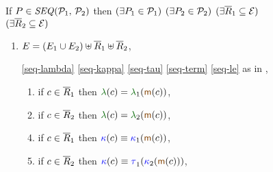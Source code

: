 \begin{figure}
  \raggedright
  
  \noindent
  If $\aPS \in \sSEMI{\aPSS_1}{\aPSS_2}$ then
  $(\exists P_1\in\mathcal{P}_1)$ $(\exists P_2\in\mathcal{P}_2)$
  $(\exists\overline{R}_1\subseteq\mathcal{E})$ $(\exists\overline{R}_2\subseteq\mathcal{E})$
  \begin{multicols}{2}
    \begin{enumerate}[topsep=0pt,label=(\textsc{s}\arabic*),ref=\textsc{s}\arabic*]
      \setcounter{enumi}{\value{BE}}
    \item \label{seq-E-phantom}
      $E=(E_1\cup E_2)\uplus\overline{R}_1 \uplus\overline{R}_2$,

    \item[\eqref{seq-lambda}]
      \eqref{seq-kappa}\;
      \eqref{seq-tau}\;
      \eqref{seq-term}\;
      \eqref{seq-le}\;
      as in ,

      \setcounter{enumi}{\value{lambda}}
    \item[] 
      \begin{enumerate}[leftmargin=0pt]
      \item \label{seq-lambda-phantom1}
        if $c\in \overline{R}_1$ then $\labeling(\cEv)=\labeling_1(\fmrg{\cEv})$,
      \item \label{seq-lambda-phantom2}
        if $c\in \overline{R}_2$ then $\labeling(\cEv)=\labeling_2(\fmrg{\cEv})$,
      \end{enumerate}

      \setcounter{enumi}{\value{kappa}}
    \item[] 
      \begin{enumerate}[leftmargin=0pt]
        \setcounter{enumii}{3}
      \item \label{seq-kappa-phantom1}
        if $c\in \overline{R}_1$ then $\labelingForm(\cEv)\riff\labelingForm_1(\fmrg{\cEv})$,
      \item \label{seq-kappa-phantom2}
        if $c\in \overline{R}_2$ then $\labelingForm(\cEv)\riff\aTr[1]{}{\labelingForm_2(\fmrg{\cEv})}$,
      \end{enumerate}


\end{enumerate}
\end{multicols}
\end{figure}
